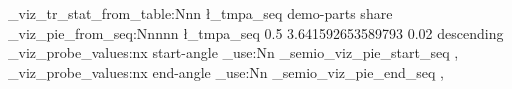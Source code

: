 \documentclass{article}
\begin{document}
\ExplSyntaxOn
{}
\semio_viz_tr_stat_from_table:Nnn \l_tmpa_seq { demo-parts } { share }
\semio_viz_pie_from_seq:Nnnnn \l_tmpa_seq { 0.5 } { 3.641592653589793 } { 0.02 } { descending }
\semio_viz_probe_values:nx { start-angle } { \seq_use:Nn \g_semio_viz_pie_start_seq { , } }
\semio_viz_probe_values:nx { end-angle } { \seq_use:Nn \g_semio_viz_pie_end_seq { , } }
\ExplSyntaxOff
\end{document}
